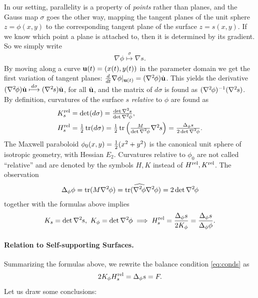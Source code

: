 \documentclass[review]{acmsiggraph}
\def\wh{\widehat}
\def\tr{\mathop{{\rm tr}}\nolimits}
\def\rel{{\mathord{{\rm rel}}}}
\def\ess{s}
\def\Hess#1{{\def\testess{#1}\nabla^2\ifx\testess\ess\!s\else #1\fi}}
\def\Hess#1{\text{$\nabla^2\hskip-.2ex #1$}}
\begin{document}
In our setting, parallelity is a property of {\em points} rather than 
planes, and the Gauss map $\sigma$ goes the other way, mapping the tangent 
planes of the unit sphere $z=\phi(x,y)$ to the corresponding tangent plane 
of the surface $z=s(x,y)$. If we know which point a plane is attached to, 
then it is determined by its gradient. So we simply write
	\begin{align*}
	\nabla \phi\overset\sigma\longmapsto\nabla s.
	\end{align*}
 By moving along a curve ${\mathbf u}(t)=(x(t),y(t))$ in the parameter domain we
get the first variation of tangent planes:
	$
	{d\over dt}\nabla \phi|_{\uw(t)} =
	(\Hess\phi)\dot\uw
	$.
 This yields the derivative
	$	
	(\Hess\phi)\dot\uw \overset{d\sigma}\longmapsto
	(\Hess s)\dot\uw $,
 for all $\dot{{\mathbf u}}$, and the matrix of $d\sigma$ is found as 
$(\Hess\phi)^{-1}(\Hess s)$.  By definition, curvatures of the surface $s$ 
{\em relative} to $\phi$ are found as
	\begin{align*}
		K_s^\rel
	& = \textstyle
		\det(d\sigma) =
		{\det\Hess s \over \det\Hess\phi} ,
	\\
		H_s^\rel
	&= \textstyle
		{1\over 2}\tr(d\sigma)
		= {1\over 2}\tr \left({M\over\det\Hess\phi} \Hess s\right)
		=  {\Delta_\phi s \over 2\det\Hess\phi}.
	\end{align*}
 The Maxwell paraboloid $\phi_0(x,y)={1\over 2}(x^2+y^2)$ is the canonical 
unit sphere of isotropic geometry, with Hessian $E_2$. Curvatures 
relative to $\phi_0$ are not called ``relative'' and are denoted by the 
symbols $H,K$ instead of $H^\rel,K^\rel$. The observation
	\begin{align*}
	\Delta_\phi \phi
	= \tr(M \Hess \phi)
	= \tr(\wh{\Hess\phi}\Hess\phi)
	= 2\det\Hess\phi
	\end{align*}
 together with the formulas above implies
	\begin{align*}
		K_s  = \det \Hess s, 
	\
		K_\phi = \det \Hess \phi
	\implies
		H_s^\rel =  {\Delta_\phi s \over 2 K_\phi}
			= {\Delta_\phi s\over \Delta_\phi \phi}.
	\end{align*}

\paragraph{Relation to Self-supporting Surfaces.}

Summarizing the formulas above, 
we rewrite the balance condition \eqref{eq:conds} as
	\begin{equation}
	2 K_\phi H_s^\rel  = \Delta_\phi s = F.
	\label{equigeo}
	\end{equation}
 Let us draw some conclusions:
\end{document}

